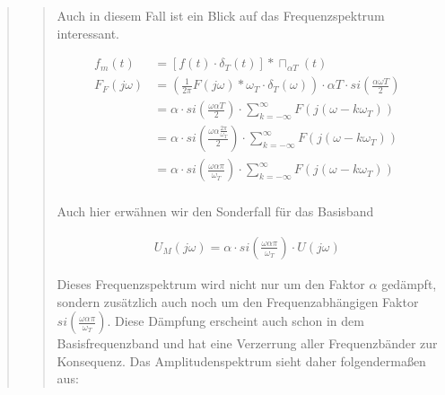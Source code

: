 \begin{quote}
\begin{quote}
        Auch in diesem Fall ist ein Blick auf das Frequenzspektrum interessant.
        
            \begin{equation*}
                \begin{split}
                    f_m (t) &= [f (t) \cdot \delta_T (t)] \ast \sqcap_{\alpha T} (t)\\
                    F_F (j\omega) &= \left ( \frac{1}{2 \pi} F (j\omega) \ast \omega_T
                    \cdot \delta_T (\omega) \right) \cdot \alpha T \cdot si (\frac{\alpha \omega T}{2})\\
                    &= \alpha \cdot si \left( \frac{\omega \alpha T}{2} \right) \cdot \sum_{k=-\infty}^{\infty} F(j(\omega -
                    k\omega_T))\\
                    &= \alpha \cdot si \left( \frac{\omega \alpha \frac{2 \pi}{\omega_T}}{2} \right) \cdot
                    \sum_{k=-\infty}^{\infty} F(j(\omega - k\omega_T))\\
                    &= \alpha \cdot si \left( \frac{\omega \alpha \pi}{\omega_T} \right) \cdot
                    \sum_{k=-\infty}^{\infty} F(j(\omega - k\omega_T))\\
                \end{split}
            \end{equation*}

        Auch hier erwähnen wir den Sonderfall für das Basisband
        
        \begin{equation*}
        	\begin{split}
        		U_M (j\omega) = \alpha \cdot si \left( \frac{\omega \alpha \pi}{\omega_T}\right) \cdot U (j \omega)
        	\end{split}
        \end{equation*}
        
        Dieses Frequenzspektrum wird nicht nur um den Faktor $\alpha$ gedämpft,
        sondern zusätzlich auch noch um den Frequenzabhängigen Faktor $si \left( \frac{\omega \alpha \pi}{\omega_T}\right) $. 
        Diese Dämpfung erscheint auch schon in dem Basisfrequenzband und hat
        eine Verzerrung aller Frequenzbänder zur Konsequenz. Das Amplitudenspektrum sieht daher folgendermaßen aus:
        

\end{quote}
\end{quote}
